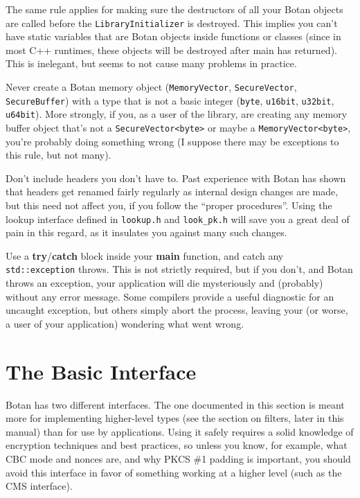 \documentclass{article}
\newcommand{\filename}[1]{\texttt{#1}}
\newcommand{\function}[1]{\textbf{#1}}
\newcommand{\type}[1]{\texttt{#1}}
\begin{document}
The same rule applies for making sure the destructors of all your Botan objects
are called before the \type{LibraryInitializer} is destroyed. This implies you
can't have static variables that are Botan objects inside functions or classes
(since in most C++ runtimes, these objects will be destroyed after main has
returned). This is inelegant, but seems to not cause many problems in practice.

Never create a Botan memory object (\type{MemoryVector}, \type{SecureVector},
\type{SecureBuffer}) with a type that is not a basic integer (\type{byte},
\type{u16bit}, \type{u32bit}, \type{u64bit}). More strongly, if you, as a user
of the library, are creating any memory buffer object that's not a
\type{SecureVector<byte>} or maybe a \type{MemoryVector<byte>}, you're probably
doing something wrong (I suppose there may be exceptions to this rule, but not
many).

Don't include headers you don't have to. Past experience with Botan has shown
that headers get renamed fairly regularly as internal design changes are made,
but this need not affect you, if you follow the ``proper procedures''. Using
the lookup interface defined in \filename{lookup.h} and \filename{look\_pk.h}
will save you a great deal of pain in this regard, as it insulates you against
many such changes.

Use a \function{try}/\function{catch} block inside your
\function{main} function, and catch any \type{std::exception}
throws. This is not strictly required, but if you don't, and Botan
throws an exception, your application will die mysteriously and
(probably) without any error message. Some compilers provide a useful
diagnostic for an uncaught exception, but others simply abort the
process, leaving your (or worse, a user of your application) wondering
what went wrong.

\pagebreak

\section{The Basic Interface}

Botan has two different interfaces. The one documented in this section is meant
more for implementing higher-level types (see the section on filters, later in
this manual) than for use by applications. Using it safely requires a solid
knowledge of encryption techniques and best practices, so unless you know, for
example, what CBC mode and nonces are, and why PKCS \#1 padding is important,
you should avoid this interface in favor of something working at a higher level
(such as the CMS interface).
\end{document}
